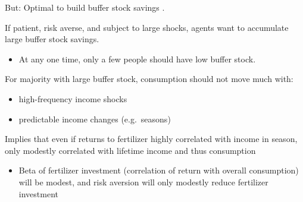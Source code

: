 \documentclass[aspectratio=169, 10pt, handout]{beamer}
\newenvironment{wideitemize}{\itemize\addtolength{\itemsep}{10pt}}{\enditemize}
\begin{document}
\begin{frame}{But: Optimal to build buffer stock savings \citep{deaton1991saving,carroll1997buffer}.}

\begin{wideitemize}
	
	\item If patient, risk averse, and subject to large shocks, agents want to accumulate large buffer stock savings. 
	
	\begin{itemize}

    	\item At any one time, only a few people should have low buffer stock.
	
	\end{itemize}

	\item For majority with  large buffer stock, consumption should not move much with:

	\begin{itemize}

		\item high-frequency income shocks
		
		\item predictable income changes (e.g.\ seasons)

	\end{itemize}

	\item Implies that even if returns to fertilizer highly correlated with income in season, only modestly correlated with lifetime income and thus consumption

	\begin{itemize}
		
		\item Beta of fertilizer investment (correlation of return with overall consumption) will be modest, and risk aversion will only modestly reduce fertilizer investment

	\end{itemize}

\end{wideitemize}

\end{frame}
\end{document}
